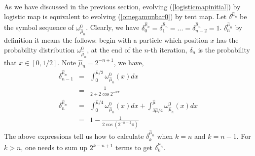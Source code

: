 \documentclass{article}
\begin{document}
As we have discussed in the previous section, evolving (\ref{logisticmapinitial}) by logistic map is equivalent to evolving (\ref{omegamunbar0}) by tent map. Let $\delta^{\hat{\mu}_n}$ be the symbol sequence of $\omega_{\hat{\mu}_n}^0$. Clearly, we have $\delta_0^{\hat{\mu}_n}=\delta_1^{\hat{\mu}_n}=...=\delta_{n-2}^{\hat{\mu}_n}=1$. $\delta_n^{\hat{\mu}_n}$ by definition it means the follows: begin with a particle which position $x$ has the probability distribution $\omega_{\hat{\mu}_n}^0$, at the end of the $n$-th iteration, $\delta_n$ is the probability that $x \in [0,1/2]$. Note $\hat{\mu}_n = 2^{-n+1}$, we have,
\begin{eqnarray}
\label{deltan}
     \delta_{n-1}^{\hat{\mu}_n} &=&  \int_0^{\hat{\mu}/2} \omega_{\hat{\mu}_n}^0(x)dx \nonumber\\
                                &=&   \frac{1}{2+2\cos{2^{-n\pi}}}\\
     \delta_n^{\hat{\mu}_n} &=& \int_0^{\hat{\mu}/4} \omega_{\hat{\mu}_n}^0(x)dx  
                               + \int_{3\hat{\mu}/4}^{\hat{\mu}} \omega_{\hat{\mu}_n}^0(x)dx\nonumber\\
                            &=&    1-\frac{1}{2\cos(2^{-n-2}\pi)}
\end{eqnarray}
The above expressions tell us how to calculate $\delta_k^{\hat{\mu}_n}$ when $k=n$ and $k=n-1$. For $k>n$, one needs to sum up $2^{k-n+1}$ terms to get $\delta_k^{\hat{\mu}_n}$. 
\end{document}
